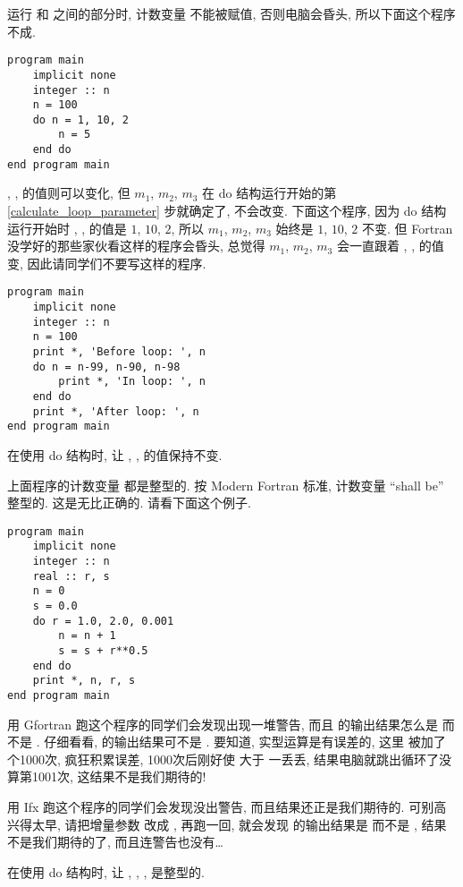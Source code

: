 运行  和  之间的部分时, 计数变量 \ttt{[m]} 不能被赋值, 否则电脑会昏头, 所以下面这个程序不成.
\begin{lstlisting}
program main
    implicit none
    integer :: n
    n = 100
    do n = 1, 10, 2
        n = 5
    end do
end program main
\end{lstlisting}
\ttt{[m1]}, \ttt{[m2]}, \ttt{[m3]} 的值则可以变化, 但 $m_1$, $m_2$, $m_3$ 在 do 结构运行开始的第 \ref{calculate_loop_parameter} 步就确定了, 不会改变. 下面这个程序, 因为 do 结构运行开始时 \ttt{[m1]}, \ttt{[m2]}, \ttt{[m3]} 的值是 $1$, $10$, $2$, 所以 $m_1$, $m_2$, $m_3$ 始终是 $1$, $10$, $2$ 不变. 但 Fortran 没学好的那些家伙看这样的程序会昏头, 总觉得 $m_1$, $m_2$, $m_3$ 会一直跟着 \ttt{[m1]}, \ttt{[m2]}, \ttt{[m3]} 的值变, 因此请同学们不要写这样的程序.
\begin{lstlisting}
program main
    implicit none
    integer :: n
    n = 100
    print *, 'Before loop: ', n
    do n = n-99, n-90, n-98
        print *, 'In loop: ', n
    end do
    print *, 'After loop: ', n
end program main
\end{lstlisting}
\begin{convention}
    在使用 do 结构时, 让 \ttt{\emph{[m1]}}, \ttt{\emph{[m2]}}, \ttt{\emph{[m3]}} 的值保持不变.
\end{convention}

上面程序的计数变量 \ttt{[m]} 都是整型的. 按 Modern Fortran 标准, 计数变量 ``shall be'' 整型的. 这是无比正确的. 请看下面这个例子.
\begin{lstlisting}
program main
    implicit none
    integer :: n
    real :: r, s
    n = 0
    s = 0.0
    do r = 1.0, 2.0, 0.001
        n = n + 1
        s = s + r**0.5
    end do
    print *, n, r, s
end program main
\end{lstlisting}

用 Gfortran 跑这个程序的同学们会发现出现一堆警告, 而且  的输出结果怎么是  而不是 . 仔细看看,  的输出结果可不是 . 要知道, 实型运算是有误差的, 这里  被加了个1000次, 疯狂积累误差, 1000次后刚好使  大于 一丢丢, 结果电脑就跳出循环了没算第1001次, 这结果不是我们期待的!

用 Ifx 跑这个程序的同学们会发现没出警告, 而且结果还正是我们期待的. 可别高兴得太早, 请把增量参数  改成 , 再跑一回, 就会发现  的输出结果是  而不是 , 结果不是我们期待的了, 而且连警告也没有\dots{}

\begin{convention}
    在使用 do 结构时, 让 \ttt{\emph{[m]}}, \ttt{\emph{[m1]}}, \ttt{\emph{[m2]}}, \ttt{\emph{[m3]}} 是整型的.
\end{convention}

